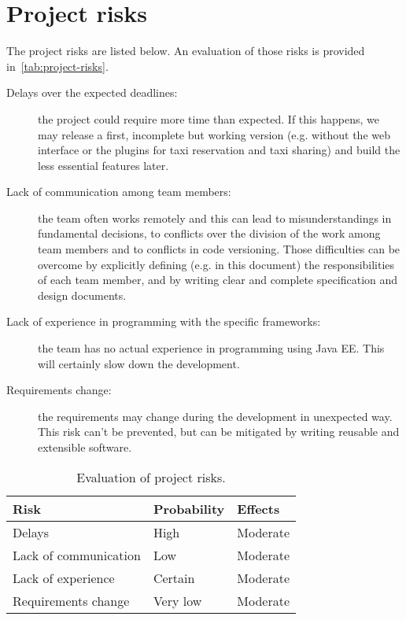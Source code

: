 \section{Project risks}

The project risks are listed below. An evaluation of those risks is provided in~\autoref{tab:project-risks}.

\begin{description}
    \item[Delays over the expected deadlines:] the project could require more time than expected. If this happens, we may release a first, incomplete but working version (e.g. without the web interface or the plugins for taxi reservation and taxi sharing) and build the less essential features later.

    \item[Lack of communication among team members:] the team often works remotely and this can lead to misunderstandings in fundamental decisions, to conflicts over the division of the work among team members and to conflicts in code versioning. Those difficulties can be overcome by explicitly defining (e.g. in this document) the responsibilities of each team member, and by writing clear and complete specification and design documents.

    \item[Lack of experience in programming with the specific frameworks:] the team has no actual experience in programming using Java EE. This will certainly slow down the development.

    \item[Requirements change:] the requirements may change during the development in unexpected way. This risk can't be prevented, but can be mitigated by writing reusable and extensible software.
\end{description}

\begin{table}[p]
\centering
    \begin{tabular}{| l | l | l |}
        \hline
        \textbf{Risk}           & \textbf{Probability}  & \textbf{Effects}  \\
        \hline
        Delays                  & High                  & Moderate          \\
        \hline
        Lack of communication   & Low                   & Moderate          \\
        \hline
        Lack of experience      & Certain               & Moderate          \\
        \hline
        Requirements change     & Very low              & Moderate          \\
        \hline
    \end{tabular}
    \caption{Evaluation of project risks.}
    \label{tab:project-risks}
\end{table}
